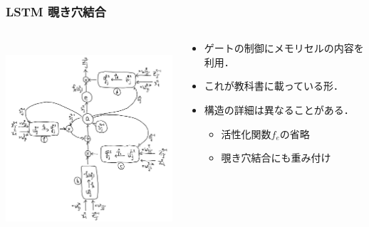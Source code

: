 \documentclass[dvipdfmx]{beamer}
\begin{document}
\begin{frame}
    \frametitle{LSTM \small{覗き穴結合}}
    \begin{columns}
        \begin{column}[T]{0.60\textwidth}
            \centering
            \includegraphics[width=7.2cm, height=7.2cm]{figure/lstm_peephole.png}
        \end{column}
        \begin{column}[T]{0.40\textwidth}
            \begin{itemize}
                \item ゲートの制御にメモリセルの内容を利用．
                \item これが教科書\cite{blue}に載っている形．
                \item 構造の詳細は異なることがある．
                    \begin{itemize}
                        \item 活性化関数$f_e$の省略
                        \item 覗き穴結合にも重み付け
                    \end{itemize}
            \end{itemize}
        \end{column}
    \end{columns}
\end{frame}
\end{document}
